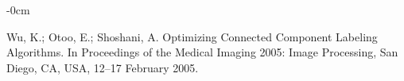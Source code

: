 \documentclass[12pt,a4paper,oneside]{report}
\newlength{\extralength}
\begin{document}
\begin{adjustwidth}{-\extralength}{0cm}
\begin{thebibliography}{999}
Wu, K.; Otoo, E.; Shoshani, A.
\newblock Optimizing Connected Component Labeling Algorithms. In Proceedings of the Medical Imaging 2005: Image Processing, San Diego, CA, USA, 12--17 February 2005. 

\end{thebibliography}





\end{adjustwidth}
\end{document}
